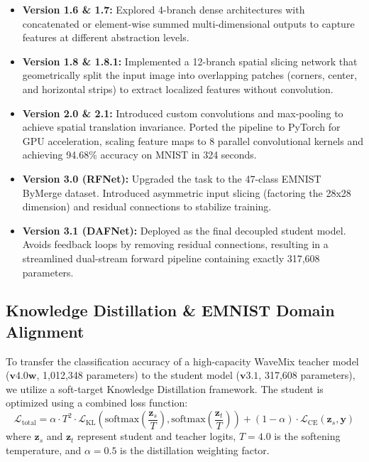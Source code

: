 \documentclass[12pt,a4paper]{article}
\begin{document}
\begin{itemize}
    \item \textbf{Version 1.6 \& 1.7:} Explored 4-branch dense architectures with concatenated or element-wise summed multi-dimensional outputs to capture features at different abstraction levels.
    \item \textbf{Version 1.8 \& 1.8.1:} Implemented a 12-branch spatial slicing network that geometrically split the input image into overlapping patches (corners, center, and horizontal strips) to extract localized features without convolution.
    \item \textbf{Version 2.0 \& 2.1:} Introduced custom convolutions and max-pooling to achieve spatial translation invariance. Ported the pipeline to PyTorch for GPU acceleration, scaling feature maps to 8 parallel convolutional kernels and achieving 94.68\% accuracy on MNIST in 324 seconds.
    \item \textbf{Version 3.0 (RFNet):} Upgraded the task to the 47-class EMNIST ByMerge dataset. Introduced asymmetric input slicing (factoring the 28x28 dimension) and residual connections to stabilize training.
    \item \textbf{Version 3.1 (DAFNet):} Deployed as the final decoupled student model. Avoids feedback loops by removing residual connections, resulting in a streamlined dual-stream forward pipeline containing exactly 317,608 parameters.
\end{itemize}

\subsection{Knowledge Distillation \& EMNIST Domain Alignment}
To transfer the classification accuracy of a high-capacity WaveMix teacher model ($\mathbf{v4.0w}$, 1,012,348 parameters) to the student model ($\mathbf{v3.1}$, 317,608 parameters), we utilize a soft-target Knowledge Distillation framework. The student is optimized using a combined loss function:
\begin{equation}
    \mathcal{L}_{\text{total}} = \alpha \cdot T^2 \cdot \mathcal{L}_{\text{KL}}\left( \text{softmax}\left(\frac{\mathbf{z}_s}{T}\right), \text{softmax}\left(\frac{\mathbf{z}_t}{T}\right) \right) + (1 - \alpha) \cdot \mathcal{L}_{\text{CE}}(\mathbf{z}_s, \mathbf{y})
\end{equation}
where $\mathbf{z}_s$ and $\mathbf{z}_t$ represent student and teacher logits, $T = 4.0$ is the softening temperature, and $\alpha = 0.5$ is the distillation weighting factor.
\end{document}
